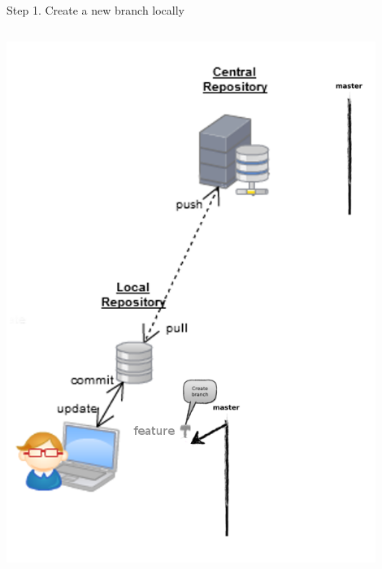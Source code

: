 \begin{frame}[fragile]{Step 1. Create a new branch locally}
\begin{columns}
\begin{column}{0.4\textwidth}
\begin{center}
{				\includegraphics[width=0.9\textwidth]{branch_created.png}
			}
		\end{center}
	\end{column}
\end{columns}
\end{frame}


